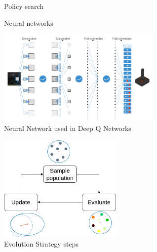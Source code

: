 \begin{frame}{\tcii{} Policy search}
\end{frame}

\begin{frame}{\tcii{} Neural networks}
    \begin{center}
      \includegraphics[width=8cm]{images/misc/dqn.png}\\
      \small Neural Network used in Deep Q Networks \cite{mnihHumanlevelControlDeep2015}
    \end{center}
\end{frame}

\begin{frame}{\tcii{} \es}
    \begin{center}
      \includegraphics[width=6cm]{images/misc/es.png}\\
      \small Evolution Strategy steps
    \end{center}
\end{frame}

